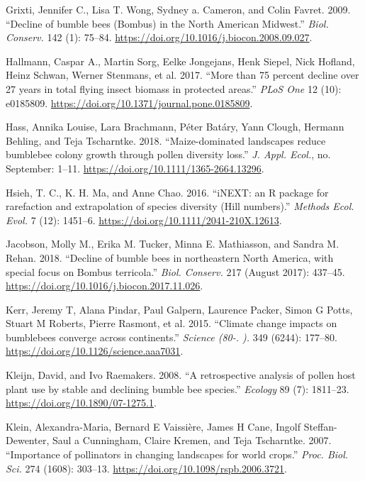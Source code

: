 \documentclass[11pt,]{article}
\begin{document}
\leavevmode\hypertarget{ref-Grixti2009}{}%
Grixti, Jennifer C., Lisa T. Wong, Sydney a. Cameron, and Colin Favret.
2009. ``Decline of bumble bees (Bombus) in the North American Midwest.''
\emph{Biol. Conserv.} 142 (1): 75--84.
\url{https://doi.org/10.1016/j.biocon.2008.09.027}.

\leavevmode\hypertarget{ref-Hallmann2017}{}%
Hallmann, Caspar A., Martin Sorg, Eelke Jongejans, Henk Siepel, Nick
Hofland, Heinz Schwan, Werner Stenmans, et al. 2017. ``More than 75
percent decline over 27 years in total flying insect biomass in
protected areas.'' \emph{PLoS One} 12 (10): e0185809.
\url{https://doi.org/10.1371/journal.pone.0185809}.

\leavevmode\hypertarget{ref-Hass2018a}{}%
Hass, Annika Louise, Lara Brachmann, Péter Batáry, Yann Clough, Hermann
Behling, and Teja Tscharntke. 2018. ``Maize-dominated landscapes reduce
bumblebee colony growth through pollen diversity loss.'' \emph{J. Appl.
Ecol.}, no. September: 1--11.
\url{https://doi.org/10.1111/1365-2664.13296}.

\leavevmode\hypertarget{ref-Hsieh2016}{}%
Hsieh, T. C., K. H. Ma, and Anne Chao. 2016. ``iNEXT: an R package for
rarefaction and extrapolation of species diversity (Hill numbers).''
\emph{Methods Ecol. Evol.} 7 (12): 1451--6.
\url{https://doi.org/10.1111/2041-210X.12613}.

\leavevmode\hypertarget{ref-Jacobson2018a}{}%
Jacobson, Molly M., Erika M. Tucker, Minna E. Mathiasson, and Sandra M.
Rehan. 2018. ``Decline of bumble bees in northeastern North America,
with special focus on Bombus terricola.'' \emph{Biol. Conserv.} 217
(August 2017): 437--45.
\url{https://doi.org/10.1016/j.biocon.2017.11.026}.

\leavevmode\hypertarget{ref-Kerr2015}{}%
Kerr, Jeremy T, Alana Pindar, Paul Galpern, Laurence Packer, Simon G
Potts, Stuart M Roberts, Pierre Rasmont, et al. 2015. ``Climate change
impacts on bumblebees converge across continents.'' \emph{Science (80-.
).} 349 (6244): 177--80. \url{https://doi.org/10.1126/science.aaa7031}.

\leavevmode\hypertarget{ref-Kleijn2008}{}%
Kleijn, David, and Ivo Raemakers. 2008. ``A retrospective analysis of
pollen host plant use by stable and declining bumble bee species.''
\emph{Ecology} 89 (7): 1811--23.
\url{https://doi.org/10.1890/07-1275.1}.

\leavevmode\hypertarget{ref-Klein2007g}{}%
Klein, Alexandra-Maria, Bernard E Vaissière, James H Cane, Ingolf
Steffan-Dewenter, Saul a Cunningham, Claire Kremen, and Teja Tscharntke.
2007. ``Importance of pollinators in changing landscapes for world
crops.'' \emph{Proc. Biol. Sci.} 274 (1608): 303--13.
\url{https://doi.org/10.1098/rspb.2006.3721}.
\end{document}
